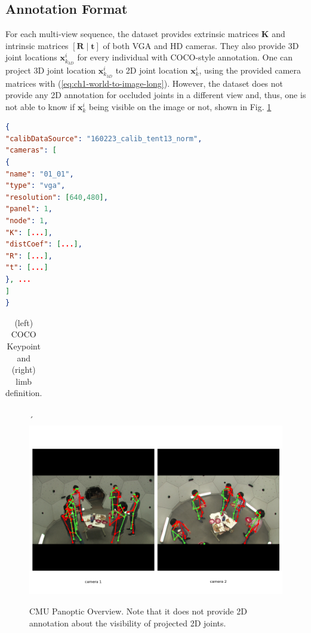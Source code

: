 \subsection{Annotation Format}
For each multi-view sequence, the dataset provides extrinsic matrices $\mathbf{K}$ and intrinsic matrices $\left[\mathbf{R}\mid \mathbf{t}\right]$ of both VGA and HD cameras. They also provide 3D joint locations $\mathbf{x}_{k_{3D}}^i$ for every individual with COCO-style annotation. One can project 3D joint location $\mathbf{x}_{k_{3D}}^i$ to 2D joint location $\mathbf{x}_{k}^i$, using the provided camera matrices with (\ref{eq:ch1-world-to-image-long}). However, the dataset does not provide any 2D annotation for occluded joints in a different view and, thus, one is not able to know if $\mathbf{x}_{k}^i$ being visible on the image or not, shown in Fig. \ref{fig:ch5-cmu-multiview}

\begin{lstlisting}[language=json,firstnumber=1, caption=Overview of Camera Annotation, label={lst:cmu-camera-matrix}]
{
"calibDataSource": "160223_calib_tent13_norm",
"cameras": [
{
"name": "01_01",
"type": "vga",
"resolution": [640,480],
"panel": 1,
"node": 1,
"K": [...],
"distCoef": [...],
"R": [...],
"t": [...]
}, ...
]
}
\end{lstlisting}

\begin{table}[htpb]
	\caption[COCO keypoints and limb definition]{(left) COCO Keypoint and (right) limb definition.}\label{ch5:coco-definition}
	\centering
	\begin{tabular}{|c|c|c|}
	\end{tabular}
\end{table}

\begin{figure}´
	\centering
	\includegraphics[width=0.7\columnwidth]{figures/ch5/panoptic-3d-annotation.png}
	\caption{CMU Panoptic Overview. Note that it does not provide 2D annotation about the visibility of projected 2D joints.} 
	\label{fig:ch5-cmu-multiview}
\end{figure}

